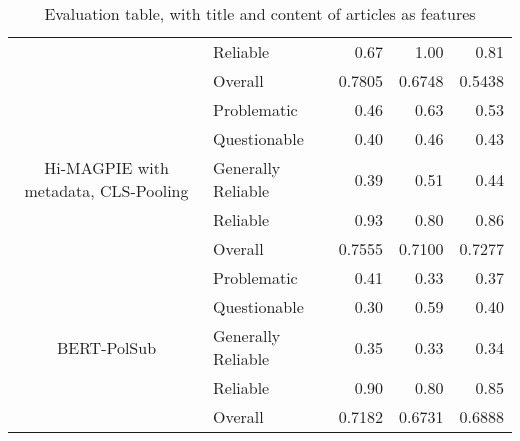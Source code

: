 \begin{table}[htbp]
\begin{longtable}{| c | l | r | r | r |}
                                                              & Reliable           & 0.67               & 1.00            & 0.81        \\\cline{2-5}
                                                              & Overall            & 0.7805             & 0.6748          & 0.5438      \\
        \hline
        \multirow{5}{*}{Hi-MAGPIE with metadata, CLS-Pooling} & Problematic        & 0.46               & 0.63            & 0.53        \\
                                                              & Questionable       & 0.40               & 0.46            & 0.43        \\
                                                              & Generally Reliable & 0.39               & 0.51            & 0.44        \\
                                                              & Reliable           & 0.93               & 0.80            & 0.86        \\\cline{2-5}
                                                              & Overall            & 0.7555             & 0.7100          & 0.7277      \\
        \hline
        \multirow{5}{*}{BERT-PolSub}                          & Problematic        & 0.41               & 0.33            & 0.37        \\
                                                              & Questionable       & 0.30               & 0.59            & 0.40        \\
                                                              & Generally Reliable & 0.35               & 0.33            & 0.34        \\
                                                              & Reliable           & 0.90               & 0.80            & 0.85        \\\cline{2-5}
                                                              & Overall            & 0.7182             & 0.6731          & 0.6888      \\
        \hline
    \end{longtable}
    \caption{Evaluation table, with title and content of articles as features}
    \label{table:eval_failed}
\end{table}

